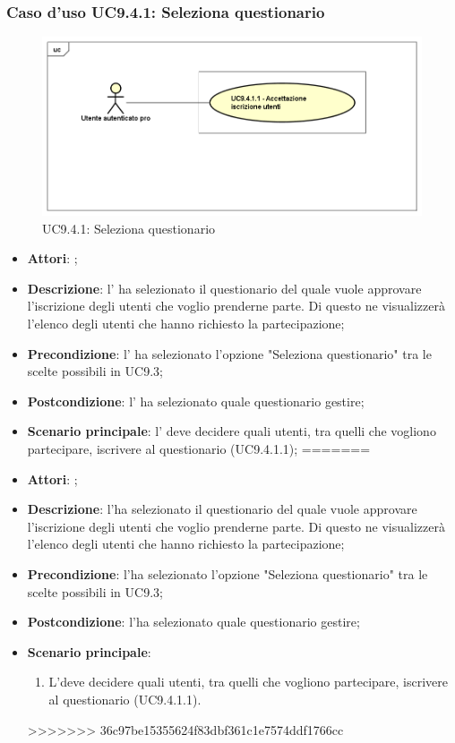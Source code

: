 		 \subsubsection{Caso d'uso UC9.4.1: Seleziona questionario}
		 \label{UC9.4.1}
		 \begin{figure}[h]
		 	\centering
		 	\includegraphics[scale=0.5,keepaspectratio]{UML/UC9_4_1.png}
		 	\caption{UC9.4.1: Seleziona questionario}
		 \end{figure}
		 \FloatBarrier
		 \begin{itemize}
<<<<<<< HEAD
		 	\item \textbf{Attori}: \uaupro{};
		 	\item \textbf{Descrizione}: l'\uaupro{} ha selezionato il questionario del quale vuole approvare l'iscrizione degli utenti che voglio prenderne parte. Di questo ne visualizzerà l'elenco degli utenti che hanno richiesto la partecipazione; 
		 	\item \textbf{Precondizione}: l'\uaupro{} ha selezionato l'opzione "Seleziona questionario" tra le scelte possibili in UC9.3;
		 	\item \textbf{Postcondizione}: l'\uaupro{} ha selezionato quale questionario gestire;
		 	\item \textbf{Scenario principale}: l'\uaupro{} deve decidere quali utenti, tra quelli che vogliono partecipare, iscrivere al questionario (UC9.4.1.1);
=======
		 	\item \textbf{Attori}: \uaupro;
		 	\item \textbf{Descrizione}: l'\uaupro ha selezionato il questionario del quale vuole approvare l'iscrizione degli utenti che voglio prenderne parte. Di questo ne visualizzerà l'elenco degli utenti che hanno richiesto la partecipazione; 
		 	\item \textbf{Precondizione}: l'\uaupro ha selezionato l'opzione "Seleziona questionario" tra le scelte possibili in UC9.3;
		 	\item \textbf{Postcondizione}: l'\uaupro ha selezionato quale questionario gestire;
		 	\item \textbf{Scenario principale}:
		 	\begin{enumerate}
		 		\item L'\uaupro deve decidere quali utenti, tra quelli che vogliono partecipare, iscrivere al questionario (UC9.4.1.1).
		 	\end{enumerate}
>>>>>>> 36c97be15355624f83dbf361c1e7574ddf1766cc
		 \end{itemize}
		 
